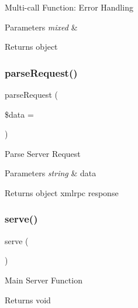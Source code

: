 Multi-\/call Function\+: Error Handling


\begin{DoxyParams}{Parameters}
{\em mixed} & \\
\hline
\end{DoxyParams}
\begin{DoxyReturn}{Returns}
object 
\end{DoxyReturn}
\mbox{\label{class_c_i___xmlrpcs_a8a0c34554b9238be766ab85f55519b6e}} 
\subsubsection{\texorpdfstring{parse\+Request()}{parseRequest()}}
{\footnotesize\ttfamily parse\+Request (\begin{DoxyParamCaption}\item[{}]{\$data = {\ttfamily \textquotesingle{}\textquotesingle{}} }\end{DoxyParamCaption})}

Parse Server Request


\begin{DoxyParams}{Parameters}
{\em string} & data \\
\hline
\end{DoxyParams}
\begin{DoxyReturn}{Returns}
object xmlrpc response 
\end{DoxyReturn}
\mbox{\label{class_c_i___xmlrpcs_aa9e0b443b9575f62bf9f8e85b1742c96}} 
\subsubsection{\texorpdfstring{serve()}{serve()}}
{\footnotesize\ttfamily serve (\begin{DoxyParamCaption}{ }\end{DoxyParamCaption})}

Main Server Function

\begin{DoxyReturn}{Returns}
void 
\end{DoxyReturn}
\mbox{\label{class_c_i___xmlrpcs_a858a05529612358b8f63c88b08b414d0}} 
